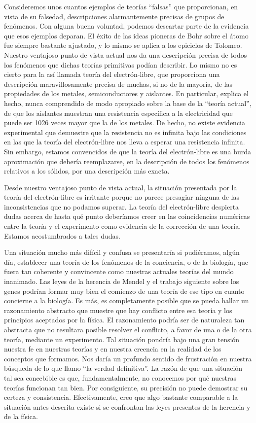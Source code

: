\documentclass[a4paper, 12pt]{article}
\begin{document}
Consideremos unos cuantos ejemplos de teorías ``falsas'' que proporcionan, en vista de su falsedad, descripciones alarmantemente precisas de grupos de fenómenos. Con alguna buena voluntad, podemos descartar parte de la evidencia que esos ejemplos deparan. El éxito de las ideas pioneras de Bohr sobre el átomo fue siempre bastante ajustado, y lo mismo se aplica a los epiciclos de Tolomeo. Nuestro ventajoso punto de vista actual nos da una descripción precisa de todos los fenómenos que dichas teorías primitivas podían describir. Lo mismo no es cierto para la así llamada teoría del electrón-libre, que proporciona una descripción maravillosamente precisa de muchas, si no de la mayoría, de las propiedades de los metales, semiconductores y aislantes. En particular, explica el hecho, nunca comprendido de modo apropiado sobre la base de la ``teoría actual'', de que los aislantes muestran una resistencia específica a la electricidad que puede ser 1026 veces mayor que la de los metales. De hecho, no existe evidencia experimental que demuestre que la resistencia no es infinita bajo las condiciones en las que la teoría del electrón-libre nos lleva a esperar una resistencia infinita. Sin embargo, estamos convencidos de que la teoría del electrón-libre es una burda aproximación que debería reemplazarse, en la descripción de todos los fenómenos relativos a los sólidos, por una descripción más exacta.

Desde nuestro ventajoso punto de vista actual, la situación presentada por la teoría del electrón-libre es irritante porque no parece presagiar ninguna de las inconsistencias que no podamos superar. La teoría del electrón-libre despierta dudas acerca de hasta qué punto deberíamos creer en las coincidencias numéricas entre la teoría y el experimento como evidencia de la corrección de una teoría. Estamos acostumbrados a tales dudas. 

Una situación mucho más difícil y confusa se presentaría si pudiéramos, algún día, establecer una teoría de los fenómenos de la conciencia, o de la biología, que fuera tan coherente y convincente como nuestras actuales teorías del mundo inanimado. Las leyes de la herencia de Mendel y el trabajo siguiente sobre los genes podrían formar muy bien el comienzo de una teoría de ese tipo en cuanto concierne a la biología. Es más, es completamente posible que se pueda hallar un razonamiento abstracto que muestre que hay conflicto entre esa teoría y los principios aceptados por la física. El razonamiento podría ser de naturaleza tan abstracta que no resultara posible resolver el conflicto, a favor de una o de la otra teoría, mediante un experimento. Tal situación pondría bajo una gran tensión nuestra fe en nuestras teorías y en nuestra creencia en la realidad de los conceptos que formamos. Nos daría un profundo sentido de frustración en nuestra búsqueda de lo que llamo ``la verdad definitiva''. La razón de que una situación tal sea concebible es que, fundamentalmente, no conocemos por qué nuestras teorías funcionan tan bien. Por consiguiente, su precisión no puede demostrar su certeza y consistencia. Efectivamente, creo que algo bastante comparable a la situación antes descrita existe si se confrontan las leyes presentes de la herencia y de la física.
\end{document}
